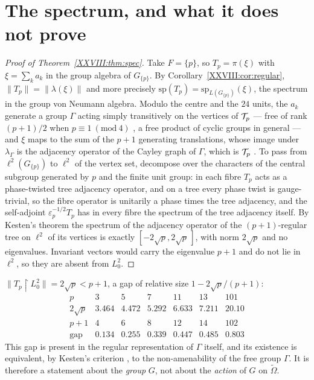 \section{The spectrum, and what it does not prove}\label{XXVIII:sec:spec}

\begin{proof}[Proof of Theorem~\ref{XXVIII:thm:spec}]
Take $F=\{p\}$, so $T_p=\pi(\xi)$ with $\xi=\sum_ka_k$ in the group algebra of $G_{\{p\}}$. By
Corollary~\ref{XXVIII:cor:regular}, $\|T_p\|=\|\lambda(\xi)\|$ and more precisely
$\mathrm{sp}(T_p)=\mathrm{sp}_{L(G_{\{p\}})}(\xi)$, the spectrum in the group von Neumann algebra.
Modulo the centre and the $24$ units, the $a_k$ generate a group $\Gamma$
acting simply transitively on the vertices of $\mathcal{T}_p$ --- free of rank $(p+1)/2$ when
$p\equiv1\ (\mathrm{mod}\ 4)$ \cite{LPS}, a free product of cyclic groups in general ---
and $\xi$ maps to the sum of the
$p+1$ generating translations, whose image under $\lambda_\Gamma$ is the adjacency operator of the
Cayley graph of $\Gamma$, which is $\mathcal{T}_p$ \cite{Serre}. To pass from $\ell^2(G_{\{p\}})$ to
$\ell^2$ of the vertex set, decompose over the characters of the central subgroup generated
by $p$ and the finite unit group: in each fibre $T_p$ acts as a phase-twisted tree adjacency
operator, and on a tree every phase twist is gauge-trivial, so the fibre operator is
unitarily a phase times the tree adjacency, and the self-adjoint $\varepsilon_p^{-1/2}T_p$
has in every fibre the spectrum of the tree adjacency itself. By Kesten's theorem \cite{Kesten} the
spectrum of the adjacency
operator of the $(p+1)$-regular tree on $\ell^2$ of its vertices is exactly
$[-2\sqrt p,2\sqrt p\,]$, with norm $2\sqrt p$ and no eigenvalues. Invariant vectors would carry
the eigenvalue $p+1$ and do not lie in $\ell^2$, so they are absent from $L^2_0$.
\end{proof}

\begin{corollary}\label{XXVIII:cor:gap}
$\|T_p\restriction L^2_0\|=2\sqrt p<p+1$, a gap of relative size $1-2\sqrt p/(p+1)$:
\[
\begin{array}{lrrrrrr}
p & 3 & 5 & 7 & 11 & 13 & 101\\
2\sqrt p & 3.464 & 4.472 & 5.292 & 6.633 & 7.211 & 20.10\\
p+1 & 4 & 6 & 8 & 12 & 14 & 102\\
\text{gap} & 0.134 & 0.255 & 0.339 & 0.447 & 0.485 & 0.803
\end{array}
\]
This gap is present in the regular representation of $\Gamma$ itself, and its existence is
equivalent, by Kesten's criterion \cite{Kesten}, to the non-amenability of the free group
$\Gamma$. It is
therefore a statement about the \emph{group} $G$, not about the \emph{action} of $G$ on
$\widetilde\Omega$.
\end{corollary}

